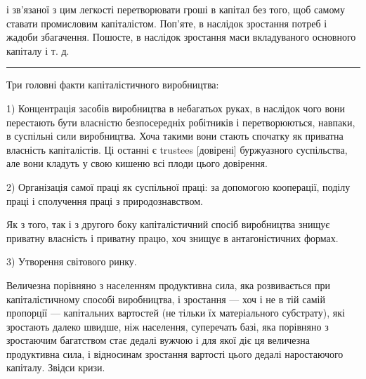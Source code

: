 \parcont{}  %
і зв’язаної з цим легкості перетворювати гроші в капітал без того,
щоб самому ставати промисловим капіталістом. Поп’яте, в наслідок
зростання потреб і жадоби збагачення. Пошосте, в наслідок
зростання маси вкладуваного основного капіталу і т. д.

\pfbreak{}

Три головні факти капіталістичного виробництва:

1) Концентрація засобів виробництва в небагатьох руках,
в наслідок чого вони перестають бути власністю безпосередніх
робітників і перетворюються, навпаки, в суспільні сили виробництва.
Хоча такими вони стають спочатку як приватна власність
капіталістів. Ці останні є trustees [довірені] буржуазного суспільства,
але вони кладуть у свою кишеню всі плоди цього довірення.

2) Організація самої праці як суспільної праці: за допомогою
кооперації, поділу праці і сполучення праці з природознавством.

Як з того, так і з другого боку капіталістичний спосіб виробництва
знищує приватну власність і приватну працю, хоч
знищує в антагоністичних формах.

3) Утворення світового ринку.

Величезна порівняно з населенням продуктивна сила, яка розвивається
при капіталістичному способі виробництва, і зростання
— хоч і не в тій самій пропорції — капітальних вартостей
(не тільки їх матеріального субстрату), які зростають далеко
швидше, ніж населення, суперечать базі, яка порівняно з зростаючим
багатством стає дедалі вужчою і для якої діє ця величезна
продуктивна сила, і відносинам зростання вартості цього
дедалі наростаючого капіталу. Звідси кризи.

